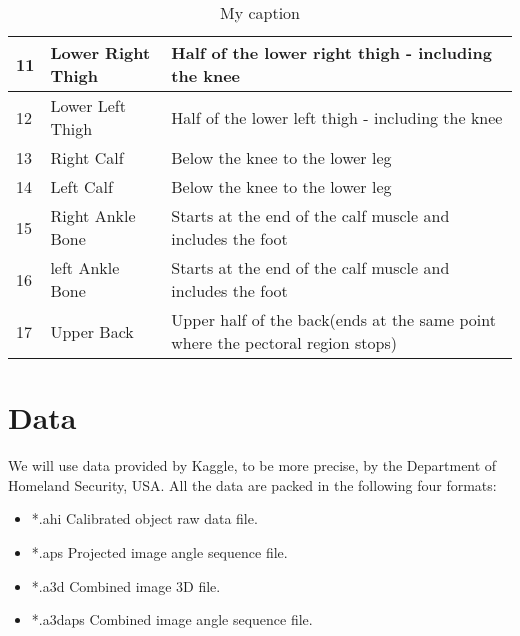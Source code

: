 \documentclass[conference,compsoc]{IEEEtran}
\begin{document}
\begin{table}[h]
\begin{tabular}{|p{1cm}|p{1.5cm}|p{4.5cm}|}
	11                           & Lower Right Thigh       & Half of the lower right thigh - including the knee                                                                 \\ \midrule
	12                           & Lower Left Thigh        & Half of the lower left thigh - including the knee                                                                  \\ \midrule
	13                           & Right Calf              & Below the knee to the lower leg                                                                                    \\ \midrule
	14                           & Left Calf               & Below the knee to the lower leg                                                                                    \\ \midrule
	15                           & Right Ankle Bone        & Starts at the end of the calf muscle and includes the foot                                                         \\ \midrule
	16                           & left Ankle Bone         & Starts at the end of the calf muscle and includes the foot                                                         \\ \midrule
	17                           & Upper Back              & Upper half of the back(ends at the same point where the pectoral region stops)                                     \\ \bottomrule
	\end{tabular}%
	\caption{My caption}
	\label{my-label}
	\end{table}

\section{Data}
	We will use data provided by Kaggle, to be more precise, by the Department of Homeland Security, USA. All the data are packed in the following four formats:
	\begin{itemize}
		\item{*.ahi} Calibrated object raw data file.
		\item{*.aps} Projected image angle sequence file.
		\item{*.a3d} Combined image 3D file.
		\item{*.a3daps} Combined image angle sequence file.
	\end{itemize}
\end{document}
